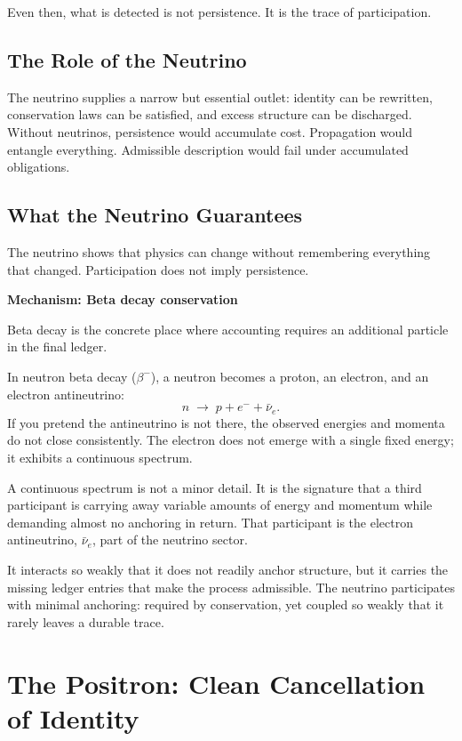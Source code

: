 \documentclass[11pt,twoside,openright]{book}
\newenvironment{mechanismbox}[1]
  {\begin{framed}\noindent\textbf{Mechanism: #1}\par\medskip}
  {\end{framed}}
\begin{document}
Even then, what is detected is not persistence. It is the trace of participation.

\section*{The Role of the Neutrino}

The neutrino supplies a narrow but essential outlet: identity can be rewritten, conservation laws can be satisfied, and excess structure can be discharged. Without neutrinos, persistence would accumulate cost. Propagation would entangle everything. Admissible description would fail under accumulated obligations.

\section*{What the Neutrino Guarantees}

The neutrino shows that physics can change without remembering everything that changed. Participation does not imply persistence.

\begin{mechanismbox}{Beta decay conservation}
Beta decay is the concrete place where accounting requires an additional particle in the final ledger.

In neutron beta decay ($\beta^-$), a neutron becomes a proton, an electron, and an
electron antineutrino:
\[
n \;\to\; p + e^- + \bar{\nu}_e.
\]
If you pretend the antineutrino is not there, the observed energies and momenta do not
close consistently.
The electron does not emerge with a single fixed energy; it exhibits a continuous spectrum.

A continuous spectrum is not a minor detail. It is the signature that a third participant is carrying away variable amounts of energy and momentum while demanding almost no anchoring in return. That participant is the electron antineutrino, $\bar{\nu}_e$, part of the neutrino sector.

It interacts so weakly that it does not readily anchor structure, but it carries the missing ledger entries that make the process admissible.
The neutrino participates with minimal anchoring: required by conservation, yet coupled so weakly that it rarely leaves a durable trace.
\end{mechanismbox}

\chapter{The Positron: Clean Cancellation of Identity}
\end{document}
